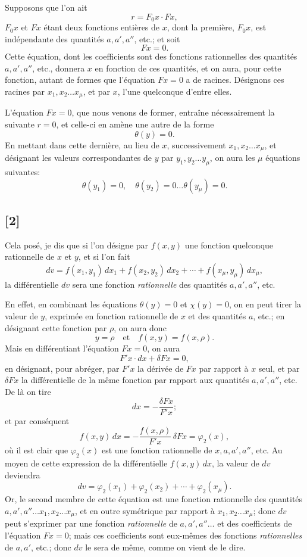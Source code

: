 \documentclass{article}
\begin{document}
Supposons que l'on ait
\[ r = F_{0} x \cdot F x, \tag{4} \]
$F_0 x$ et $F x$ étant deux fonctions entières de $x$, dont la première, $F_0 x$, est indépendante des quantités $a, a', a''$, etc.; et soit
\[ F x = 0. \tag{5} \]
Cette équation, dont les coefficients sont des fonctions rationnelles des quantités $a, a', a''$, etc., donnera $x$ en fonction de ces quantités, et on aura, pour cette fonction, autant de formes que l'équation $F x = 0$ a de racines. Désignons ces racines par $x_1, x_2 \ldots x_\mu$, et par $x$, l'une quelconque d'entre elles.

L'équation $F x = 0$, que nous venons de former, entraîne nécessairement la suivante $r = 0$, et celle-ci en amène une autre de la forme
\[ \theta(y) = 0. \tag{6} \]
En mettant dans cette dernière, au lieu de $x$, successivement $x_1, x_2 \ldots x_\mu$, et désignant les valeurs correspondantes de $y$ par $y_1, y_2 \ldots y_\mu$, on aura les $\mu$ équations suivantes:
\[ \theta(y_1) = 0, \quad \theta(y_2) = 0 \ldots \theta(y_\mu) = 0. \tag{7} \]
\subsection*{[2]}

Cela posé, je dis que si l'on désigne par $f(x, y)$ une fonction quelconque rationnelle de $x$ et $y$, et si l'on fait
\[ dv = f(x_1, y_1)\,dx_1 + f(x_2, y_2)\,dx_2 + \cdots + f(x_\mu, y_\mu)\,dx_\mu, \tag{8} \]
la différentielle $dv$ sera une fonction \emph{rationnelle} des quantités $a, a', a''$, etc.

En effet, en combinant les équations $\theta(y) = 0$ et $\chi(y) = 0$, on en peut tirer la valeur de $y$, exprimée en fonction rationnelle de $x$ et des quantités $a$, etc.; en désignant cette fonction par $\rho$, on aura donc
\[ y = \rho \quad \text{et} \quad f(x, y) = f(x, \rho). \tag{9} \]
Mais en différentiant l'équation $F x = 0$, on aura
\[ F' x \cdot dx + \delta F x = 0, \]
en désignant, pour abréger, par $F' x$ la dérivée de $F x$ par rapport à $x$ seul, et par $\delta F x$ la différentielle de la même fonction par rapport aux quantités $a, a', a''$, etc. De là on tire
\[ dx = -\frac{\delta F x}{F' x}; \tag{10} \]
et par conséquent
\[ f(x, y)\,dx = -\frac{f(x, \rho)}{F' x}\,\delta F x = \varphi_2(x), \tag{11} \]
où il est clair que $\varphi_2(x)$ est une fonction rationnelle de $x, a, a', a''$, etc. Au moyen de cette expression de la différentielle $f(x, y)\,dx$, la valeur de $dv$ deviendra
\[ dv = \varphi_2(x_1) + \varphi_2(x_2) + \cdots + \varphi_2(x_\mu). \]
Or, le second membre de cette équation est une fonction
rationnelle des quantités $a, a', a'' \ldots x_1, x_2 \ldots x_\mu$, et en outre symétrique par rapport à $x_1, x_2 \ldots x_\mu$; donc $dv$ peut s'exprimer par une fonction \emph{rationnelle} de $a, a', a'' \ldots$ et des coefficients de l'équation $F x = 0$; mais ces coefficients sont eux-mêmes des fonctions \emph{rationnelles} de $a, a'$, etc.; donc $dv$ le sera de même, comme on vient de le dire.
\end{document}

